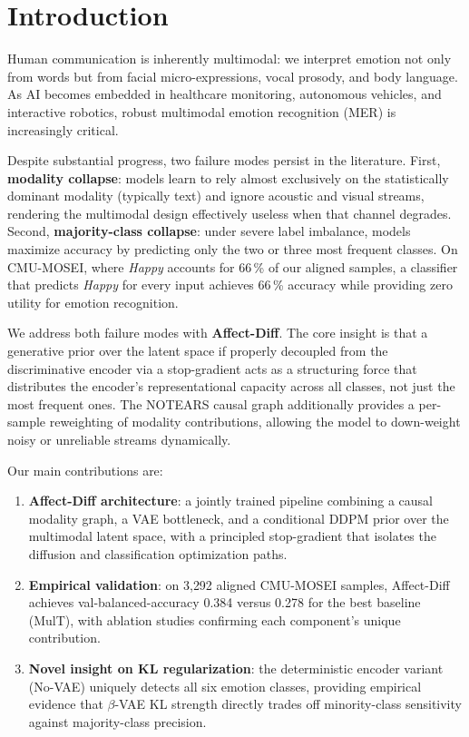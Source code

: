 \documentclass[conference]{IEEEtran}
\begin{document}
\section{Introduction}

Human communication is inherently multimodal: we interpret emotion not only
from words but from facial micro-expressions, vocal prosody, and body language.
As AI becomes embedded in healthcare monitoring, autonomous vehicles, and
interactive robotics, robust multimodal emotion recognition (MER) is
increasingly critical.

Despite substantial progress, two failure modes persist in the literature.
First, \textbf{modality collapse}: models learn to rely almost exclusively on
the statistically dominant modality (typically text) and ignore acoustic and
visual streams, rendering the multimodal design effectively useless when that
channel degrades.  Second, \textbf{majority-class collapse}: under severe label
imbalance, models maximize accuracy by predicting only the two or three most
frequent classes.  On CMU-MOSEI, where \emph{Happy} accounts for 66\,\% of our
aligned samples, a classifier that predicts \emph{Happy} for every input
achieves 66\,\% accuracy while providing zero utility for emotion recognition.

We address both failure modes with \textbf{Affect-Diff}.  The core insight is
that a generative prior over the latent space if properly decoupled from the
discriminative encoder via a stop-gradient acts as a structuring force that
distributes the encoder's representational capacity across all classes, not just
the most frequent ones.  The NOTEARS causal graph additionally provides a
per-sample reweighting of modality contributions, allowing the model to
down-weight noisy or unreliable streams dynamically.

Our main contributions are:
\begin{enumerate}
    \item \textbf{Affect-Diff architecture}: a jointly trained pipeline
    combining a causal modality graph, a VAE bottleneck, and a conditional
    DDPM prior over the multimodal latent space, with a principled stop-gradient
    that isolates the diffusion and classification optimization paths.
    \item \textbf{Empirical validation}: on 3{,}292 aligned CMU-MOSEI samples,
    Affect-Diff achieves val-balanced-accuracy 0.384 versus 0.278 for the best
    baseline (MulT), with ablation studies confirming each component's unique
    contribution.
    \item \textbf{Novel insight on KL regularization}: the deterministic
    encoder variant (No-VAE) uniquely detects all six emotion classes, providing
    empirical evidence that $\beta$-VAE KL strength directly trades off
    minority-class sensitivity against majority-class precision.
\end{enumerate}
\end{document}
